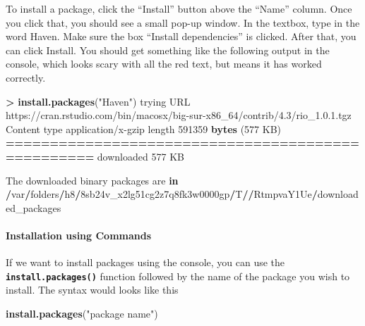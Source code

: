 \documentclass[
]{book}
\newenvironment{Shaded}{\begin{snugshade}}{\end{snugshade}}
\newcommand{\ControlFlowTok}[1]{\textcolor[rgb]{0.13,0.29,0.53}{\textbf{#1}}}
\newcommand{\DecValTok}[1]{\textcolor[rgb]{0.00,0.00,0.81}{#1}}
\newcommand{\ErrorTok}[1]{\textcolor[rgb]{0.64,0.00,0.00}{\textbf{#1}}}
\newcommand{\FunctionTok}[1]{\textcolor[rgb]{0.13,0.29,0.53}{\textbf{#1}}}
\newcommand{\NormalTok}[1]{#1}
\newcommand{\SpecialCharTok}[1]{\textcolor[rgb]{0.81,0.36,0.00}{\textbf{#1}}}
\newcommand{\StringTok}[1]{\textcolor[rgb]{0.31,0.60,0.02}{#1}}
\begin{document}
To install a package, click the ``Install'' button above the ``Name'' column. Once you click that, you should see a small pop-up window. In the textbox, type in the word Haven. Make sure the box ``Install dependencies'' is clicked. After that, you can click Install. You should get something like the following output in the console, which looks scary with all the red text, but means it has worked correctly.

\begin{Shaded}
\begin{Highlighting}[]
\SpecialCharTok{\textgreater{}} \FunctionTok{install.packages}\NormalTok{(}\StringTok{"Haven"}\NormalTok{)}
\NormalTok{trying URL }\StringTok{\textquotesingle{}https://cran.rstudio.com/bin/macosx/big{-}sur{-}x86\_64/contrib/4.3/rio\_1.0.1.tgz\textquotesingle{}}
\NormalTok{Content type }\StringTok{\textquotesingle{}application/x{-}gzip\textquotesingle{}}\NormalTok{ length }\DecValTok{591359} \FunctionTok{bytes}\NormalTok{ (}\DecValTok{577}\NormalTok{ KB)}
\SpecialCharTok{==}\ErrorTok{================================================}
\NormalTok{downloaded }\DecValTok{577}\NormalTok{ KB}


\NormalTok{The downloaded binary packages are }\ControlFlowTok{in}
    \SpecialCharTok{/}\NormalTok{var}\SpecialCharTok{/}\NormalTok{folders}\SpecialCharTok{/}\NormalTok{h8}\SpecialCharTok{/}\NormalTok{8sb24v\_x2lg51cg2z7q8fk3w0000gp}\SpecialCharTok{/}\NormalTok{T}\SpecialCharTok{/}\ErrorTok{/}\NormalTok{RtmpvaY1Ue}\SpecialCharTok{/}\NormalTok{downloaded\_packages}
\end{Highlighting}
\end{Shaded}

\hypertarget{installation-using-commands}{%
\paragraph{Installation using Commands}\label{installation-using-commands}}

If we want to install packages using the console, you can use the \textbf{\texttt{install.packages()}} function followed by the name of the package you wish to install. The syntax would looks like this

\begin{Shaded}
\begin{Highlighting}[]
\FunctionTok{install.packages}\NormalTok{(}\StringTok{"package name"}\NormalTok{)}
\end{Highlighting}
\end{Shaded}
\end{document}
